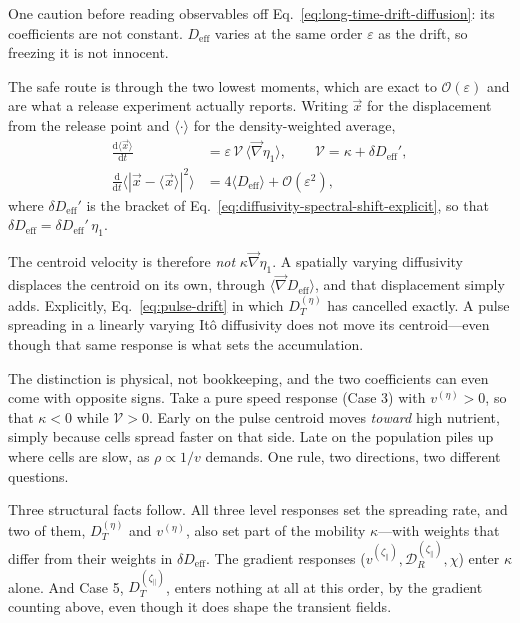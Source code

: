 \documentclass[
  reprint,
  superscriptaddress,
  amsmath,
  amssymb,
  aps,
  pre,
  nofootinbib,
  floatfix
]{revtex4-2}
\newcommand{\grad}{\vec{\nabla}}
\newcommand{\dd}{\mathrm d}
\newcommand{\ord}{\mathcal O}
\newcommand{\zp}{\zeta_\parallel}
\begin{document}
One caution before reading observables off
Eq.~\eqref{eq:long-time-drift-diffusion}: its coefficients are not constant.
$D_{\mathrm{eff}}$ varies at the same order $\varepsilon$ as the drift, so
freezing it is not innocent.

The safe route is through the two lowest moments, which are exact to
$\ord(\varepsilon)$ and are what a release experiment actually reports.
Writing $\vec x$ for the displacement from the release point and
$\langle\cdot\rangle$ for the density-weighted average,
\begin{equation}
\begin{aligned}
 \frac{\dd\langle\vec x\rangle}{\dd t}
 &=\varepsilon\,\mathcal V\,\langle\grad\eta_1\rangle,
 \qquad \mathcal V=\kappa+\delta D_{\mathrm{eff}}',\\
 \frac{\dd}{\dd t}\bigl\langle|\vec x-\langle\vec x\rangle|^2\bigr\rangle
 &=4\langle D_{\mathrm{eff}}\rangle+\ord(\varepsilon^2),
\end{aligned}
 \label{eq:pulse-moments}
\end{equation}
where $\delta D_{\mathrm{eff}}'$ is the bracket of
Eq.~\eqref{eq:diffusivity-spectral-shift-explicit}, so that
$\delta D_{\mathrm{eff}}=\delta D_{\mathrm{eff}}'\,\eta_1$.

The centroid velocity is therefore \emph{not} $\kappa\grad\eta_1$.  A
spatially varying diffusivity displaces the centroid on its own, through
$\langle\grad D_{\mathrm{eff}}\rangle$, and that displacement simply adds.
Explicitly,
Eq.~\eqref{eq:pulse-drift}
in which $D_T^{(\eta)}$ has cancelled exactly.  A pulse spreading in a
linearly varying It\^o diffusivity does not move its centroid---even though
that same response is what sets the accumulation.

The distinction is physical, not bookkeeping, and the two coefficients can
even come with opposite signs.  Take a pure speed response (Case 3) with
$v^{(\eta)}>0$, so that $\kappa<0$ while $\mathcal V>0$.  Early on the pulse
centroid moves \emph{toward} high nutrient, simply because cells spread faster
on that side.  Late on the population piles up where cells are slow, as
$\rho\propto1/v$ demands.  One rule, two directions, two different questions.

Three structural facts follow.  All three level responses set the spreading
rate, and two of them, $D_T^{(\eta)}$ and $v^{(\eta)}$, also set part of the
mobility $\kappa$---with weights that differ from their weights in
$\delta D_{\mathrm{eff}}$.  The gradient responses
($v^{(\zp)},\mathcal D_R^{(\zp)},\chi$) enter $\kappa$ alone.  And Case 5,
$D_T^{(\zp)}$, enters nothing at all at this order, by the gradient counting
above, even though it does shape the transient fields.
\end{document}
